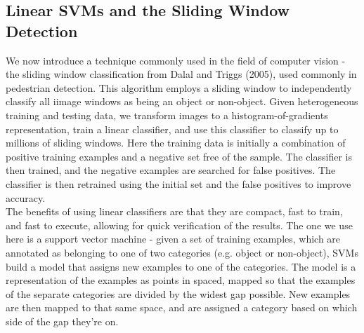 \documentclass[12pt]{article}
\begin{document}
\subsection*{Linear SVMs and the Sliding Window Detection}
We now introduce a technique commonly used in the field of computer vision - the sliding window classification from Dalal and Triggs (2005), used commonly in pedestrian detection. This algorithm employs a sliding window to independently classify all iimage windows as being an object or non-object. Given heterogeneous training and testing data, we transform images to a histogram-of-gradients representation, train a linear classifier, and use this classifier to classify up to millions of sliding windows. Here the training data is initially a combination of positive training examples and a negative set free of the sample. The classifier is then trained, and the negative examples are searched for false positives. The classifier is then retrained using the initial set and the false positives to improve accuracy.\\
\indent The benefits of using linear classifiers are that they are compact, fast to train, and fast to execute, allowing for quick verification of the results. The one we use here is a support vector machine - given a set of training examples, which are annotated as belonging to one of two categories (e.g. object or non-object), SVMs build a model that assigns new examples to one of the categories. The model is a representation of the examples as points in spaced, mapped so that the examples of the separate categories are divided by the widest gap possible. New examples are then mapped to that same space, and are assigned a category based on which side of the gap they're on.\\
\end{document}
